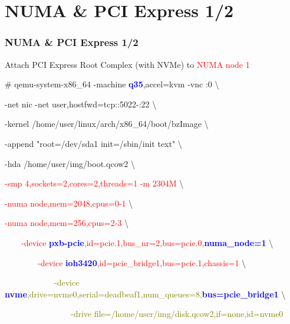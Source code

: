 \documentclass[aspectratio=169]{beamer}
\begin{document}
\section{NUMA \& PCI Express 1/2}
\begin{frame}
\frametitle{NUMA \& PCI Express 1/2}
{\large Attach PCI Express Root Complex (with NVMe) to \textcolor{red}{NUMA node 1}}
\begin{block}{}

\# qemu-system-x86\_64 -machine \textbf{\textcolor{blue}{q35}},accel=kvm -vnc :0 \textbackslash

-net nic -net user,hostfwd=tcp::5022-:22 \textbackslash

-kernel /home/user/linux/arch/x86\_64/boot/bzImage \textbackslash
	
-append "root=/dev/sda1 init=/sbin/init text" \textbackslash

-hda /home/user/img/boot.qcow2 \textbackslash

\textcolor{red}{-smp 4,sockets=2,cores=2,threads=1 -m 2304M} \textbackslash

\textcolor{red}{-numa node,mem=2048,cpus=0-1} \textbackslash

\textcolor{red}{-numa node,mem=256,cpus=2-3} \textbackslash

\textcolor{red}{\ \ \ \ -device \textbf{\textcolor{blue}{pxb-pcie}},id=pcie.1,bus\_nr=2,bus=pcie.0,\textbf{\textcolor{blue}{numa\_node=1}}} \textbackslash

\textcolor{red}{\ \ \ \ \ \ \ \ -device \textbf{\textcolor{blue}{ioh3420}},id=pcie\_bridge1,bus=pcie.1,chassis=1} \textbackslash

\textcolor{olive}{\ \ \ \ \ \ \ \ \ \ \ \ -device \textbf{\textcolor{blue}{nvme}},drive=nvme0,serial=deadbeaf1,num\_queues=8,\textbf{\textcolor{blue}{bus=pcie\_bridge1}}} \textbackslash

\textcolor{olive}{\ \ \ \ \ \ \ \ \ \ \ \ \ \ \ \ -drive file=/home/user/img/disk.qcow2,if=none,id=nvme0}

\end{block}
\end{frame}

\end{document}
